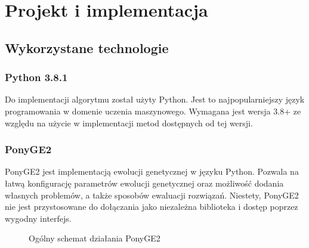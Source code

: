 \chapter{Projekt i implementacja}

\section{Wykorzystane technologie}
\subsection{Python 3.8.1}
Do implementacji algorytmu został użyty Python. Jest to najpopularniejszy język programowania w domenie uczenia maszynowego. Wymagana jest wersja 3.8+ ze względu na użycie w implementacji metod dostępnych od tej wersji.  
\subsection{PonyGE2}
PonyGE2 \cite{Fenton_2017} jest implementacją ewolucji genetycznej w języku Python. Pozwala na łatwą konfigurację parametrów ewolucji genetycznej oraz możliwość dodania własnych problemów, a także sposobów ewaluacji rozwiązań. Niestety, PonyGE2 nie jest przystosowane do dołączania jako niezależna biblioteka i dostęp poprzez wygodny interfejs.

\begin{figure}[h]
	\caption{\label{fig:PonyGE2-search-loop}Ogólny schemat działania PonyGE2}
\end{figure}


